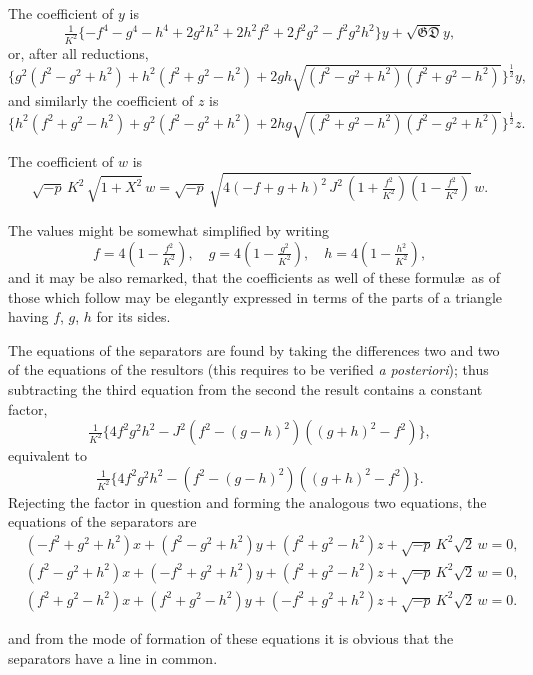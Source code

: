\documentclass[11pt,a4paper]{book}
\begin{document}
The coefficient of $y$ is
\[
\tfrac{1}{K^2}\{-f^4-g^4-h^4+2g^2h^2+2h^2f^2+2f^2g^2-f^2g^2h^2\}y + \sqrt{\mathfrak{G}\mathfrak{D}}y,
\]
or, after all reductions,
\[
\{g^2(f^2-g^2+h^2)+h^2(f^2+g^2-h^2)+2gh\sqrt{(f^2-g^2+h^2)(f^2+g^2-h^2)}\}^{\frac{1}{2}}y,
\]
and similarly the coefficient of $z$ is
\[
\{h^2(f^2+g^2-h^2)+g^2(f^2-g^2+h^2)+2hg\sqrt{(f^2+g^2-h^2)(f^2-g^2+h^2)}\}^{\frac{1}{2}}z.
\]

The coefficient of $w$ is
\[
\sqrt{-p}\,K^2\,\sqrt{1+X^2}\,w = \sqrt{-p}\,\sqrt{4(-f+g+h)^2\,J^2\,(1+\tfrac{f^2}{K^2})(1-\tfrac{f^2}{K^2})}\,w.
\]

The values might be somewhat simplified by writing
\[
f = 4(1-\tfrac{f^2}{K^2}), \quad g = 4(1-\tfrac{g^2}{K^2}), \quad h = 4(1-\tfrac{h^2}{K^2}),
\]
and it may be also remarked, that the coefficients as well of these formul\ae\ as of those which follow may be elegantly expressed in terms of the parts of a triangle having $f$, $g$, $h$ for its sides.

The equations of the separators are found by taking the differences two and two of the equations of the resultors (this requires to be verified \textit{a posteriori}); thus subtracting the third equation from the second the result contains a constant factor,
\[
\tfrac{1}{K^2}\{4f^2g^2h^2-J^2(f^2-(g-h)^2)((g+h)^2-f^2)\},
\]
equivalent to
\[
\tfrac{1}{K^2}\{4f^2g^2h^2-(f^2-(g-h)^2)((g+h)^2-f^2)\}.
\]
Rejecting the factor in question and forming the analogous two equations, the equations of the separators are
\begin{align*}
&(-f^2+g^2+h^2)x + (f^2-g^2+h^2)y + (f^2+g^2-h^2)z + \sqrt{-p}\,K^2\sqrt{2}\,w = 0,\\
&(f^2-g^2+h^2)x + (-f^2+g^2+h^2)y + (f^2+g^2-h^2)z + \sqrt{-p}\,K^2\sqrt{2}\,w = 0,\\
&(f^2+g^2-h^2)x + (f^2+g^2-h^2)y + (-f^2+g^2+h^2)z + \sqrt{-p}\,K^2\sqrt{2}\,w = 0.
\end{align*}

\newpage
\setcounter{page}{81}

and from the mode of formation of these equations it is obvious that the separators have a line in common.
\end{document}
